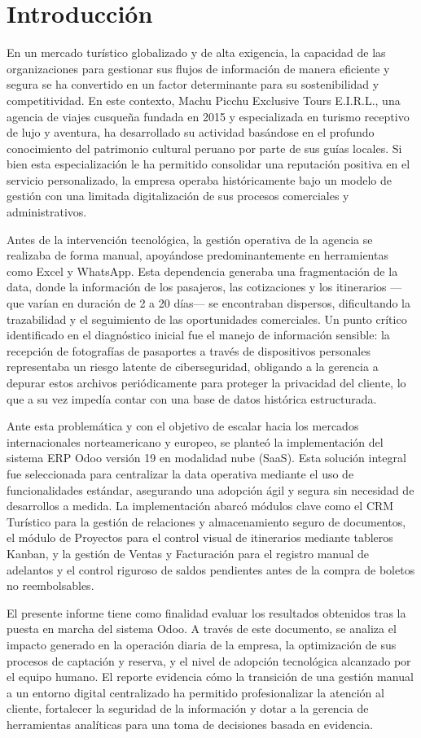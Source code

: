 \section{Introducción}

En un mercado turístico globalizado y de alta exigencia, la capacidad de las organizaciones para gestionar sus flujos de información de manera eficiente y segura se ha convertido en un factor determinante para su sostenibilidad y competitividad. En este contexto, Machu Picchu Exclusive Tours E.I.R.L., una agencia de viajes cusqueña fundada en 2015 y especializada en turismo receptivo de lujo y aventura, ha desarrollado su actividad basándose en el profundo conocimiento del patrimonio cultural peruano por parte de sus guías locales. Si bien esta especialización le ha permitido consolidar una reputación positiva en el servicio personalizado, la empresa operaba históricamente bajo un modelo de gestión con una limitada digitalización de sus procesos comerciales y administrativos.

Antes de la intervención tecnológica, la gestión operativa de la agencia se realizaba de forma manual, apoyándose predominantemente en herramientas como Excel y WhatsApp. Esta dependencia generaba una fragmentación de la data, donde la información de los pasajeros, las cotizaciones y los itinerarios ---que varían en duración de 2 a 20 días--- se encontraban dispersos, dificultando la trazabilidad y el seguimiento de las oportunidades comerciales. Un punto crítico identificado en el diagnóstico inicial fue el manejo de información sensible: la recepción de fotografías de pasaportes a través de dispositivos personales representaba un riesgo latente de ciberseguridad, obligando a la gerencia a depurar estos archivos periódicamente para proteger la privacidad del cliente, lo que a su vez impedía contar con una base de datos histórica estructurada.

Ante esta problemática y con el objetivo de escalar hacia los mercados internacionales norteamericano y europeo, se planteó la implementación del sistema ERP Odoo versión 19 en modalidad nube (SaaS). Esta solución integral fue seleccionada para centralizar la data operativa mediante el uso de funcionalidades estándar, asegurando una adopción ágil y segura sin necesidad de desarrollos a medida. La implementación abarcó módulos clave como el CRM Turístico para la gestión de relaciones y almacenamiento seguro de documentos, el módulo de Proyectos para el control visual de itinerarios mediante tableros Kanban, y la gestión de Ventas y Facturación para el registro manual de adelantos y el control riguroso de saldos pendientes antes de la compra de boletos no reembolsables.

El presente informe tiene como finalidad evaluar los resultados obtenidos tras la puesta en marcha del sistema Odoo. A través de este documento, se analiza el impacto generado en la operación diaria de la empresa, la optimización de sus procesos de captación y reserva, y el nivel de adopción tecnológica alcanzado por el equipo humano. El reporte evidencia cómo la transición de una gestión manual a un entorno digital centralizado ha permitido profesionalizar la atención al cliente, fortalecer la seguridad de la información y dotar a la gerencia de herramientas analíticas para una toma de decisiones basada en evidencia.
